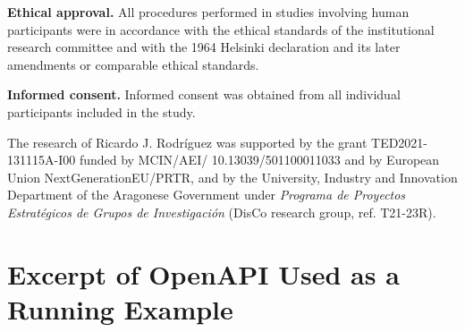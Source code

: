\documentclass[pdftex,twocolumn,epjc3]{svjour3}
\newcommand{\ackText}{The research of Ricardo J. Rodríguez was supported by the grant TED2021-131115A-I00 funded by MCIN/AEI/ 10.13039/501100011033 and by European Union NextGenerationEU/PRTR, and by the University, Industry and Innovation Department of the Aragonese Government under {\em Programa de Proyectos Estratégicos de Grupos de Investigación} (DisCo research group, ref. T21-23R).}
\begin{document}
\begin{paragraph}{\bf Ethical approval.}
All procedures performed in studies involving human participants were in accordance with the ethical standards of the institutional research committee and with the 1964 Helsinki declaration and its later amendments or comparable ethical standards. %

\end{paragraph}

\begin{paragraph}{\bf Informed consent.}
Informed consent was obtained from all individual participants included in the study.
\end{paragraph}

\begin{acknowledgements}
{\ackText}
\end{acknowledgements}




\newpage
\appendix

\section{Excerpt of OpenAPI Used as a Running Example}
\label{apx:openapi_example}




\end{document}
